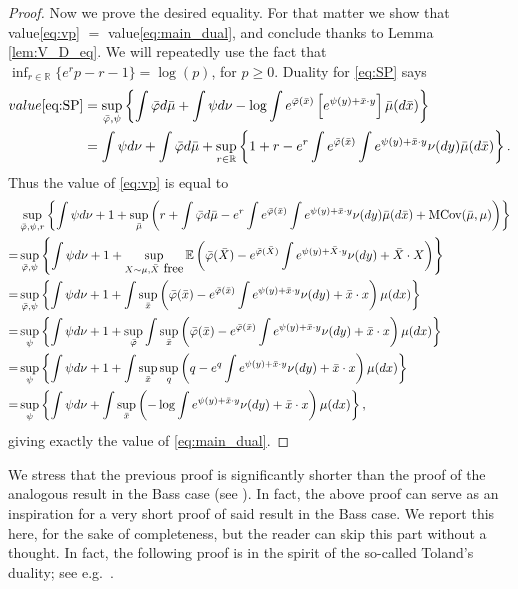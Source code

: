 \documentclass[reqno, a4paper]{amsart}
\theoremstyle{plain}
\theoremstyle{definition}
\theoremstyle{remark}
\numberwithin{equation}{section}
\numberwithin{theorem}{section}
\newcommand{\R}{\mathbb{R}}
\newcommand{\E}{\mathbb{E}}
\newcommand{\MCov}{\textnormal{MCov}}
\begin{document}
\begin{proof}
		Now we prove the desired equality. For that matter we show that value\eqref{eq:vp} $=$ value\eqref{eq:main_dual}, and conclude thanks to Lemma \ref{lem:V_D_eq}. We will repeatedly use the fact that $\inf_{r\in\R}\{ e^{r}p -r-1\}=\log(p)$,
		for $p\geq 0$. Duality for \eqref{eq:SP} says
		\begin{align*}
			value \eqref{eq:SP} & = \sup_{\bar\varphi,\psi}\left \{ \int \bar\varphi d\bar\mu +\int \psi d\nu-\log\int e^{\bar\varphi(\bar x)}\left[  e^{\psi(y)+\bar x\cdot y}\right ]\bar\mu(d\bar x)  \right \} \\
			&= \int \psi d\nu + \int \bar\varphi d\bar\mu + \sup_{r\in\R}\left \{1+r-e^r \int e^{\bar\varphi(\bar x)}\int  e^{\psi(y)+\bar x\cdot y}\nu(dy)\bar\mu(d\bar x)  \right \}.
		\end{align*}
		Thus the value of \eqref{eq:vp} is equal to
		\begin{align*}
			&  \sup_{\bar\varphi,\psi,r}\left\{\int\psi d\nu+1+ \sup_{\bar\mu}\left (r+ \int \bar\varphi d\bar\mu -e^r \int e^{\bar\varphi(\bar x)}\int  e^{\psi(y)+\bar x\cdot y}\nu(dy)\bar\mu(d\bar x) +\MCov(\bar\mu,\mu)\right)  \right\} \\
			=& \sup_{\bar\varphi,\psi}\left\{\int\psi d\nu+1+ \sup_{\substack{X\sim\mu ,\bar X \mbox{ free}}} \E\left (  \bar\varphi(\bar X) -  e^{\bar\varphi(\bar X)}\int  e^{\psi(y)+\bar X\cdot y}\nu(dy) +\bar X\cdot X\right)  \right\}\\
			=& \sup_{\bar\varphi,\psi}\left\{\int\psi d\nu+1+  \int\sup_{\bar x}\left (  \bar\varphi(\bar x) -  e^{\bar\varphi(\bar x)}\int  e^{\psi(y)+\bar x\cdot y}\nu(dy) +\bar x\cdot x\right)  \mu(dx)\right\} \\
			=& \sup_{\psi}\left\{\int\psi d\nu+1+  \sup_{\bar\varphi}\int\sup_{\bar x}\left (  \bar\varphi(\bar x) -  e^{\bar\varphi(\bar x)}\int  e^{\psi(y)+\bar x\cdot y}\nu(dy) +\bar x\cdot x\right)  \mu(dx)\right\} \\
			=& \sup_{\psi}\left\{\int\psi d\nu+1+  \int\sup_{\bar x}\sup_q\left (  q -  e^{q}\int  e^{\psi(y)+\bar x\cdot y}\nu(dy) +\bar x\cdot x\right)  \mu(dx)\right\}\\
			=& \sup_{\psi}\left\{\int\psi d\nu+  \int\sup_{\bar x}\left (  -\log  \int  e^{\psi(y)+\bar x\cdot y}\nu(dy) +\bar x\cdot x\right)  \mu(dx)\right\} ,
		\end{align*}
		giving exactly the value of \eqref{eq:main_dual}.
	\end{proof}
	
	We stress that the previous proof is significantly shorter than the proof of the analogous result in the Bass case (see \cite{BaScTs23}). In fact, the above proof can serve as an inspiration for a very short proof of said result in the Bass case. We report this here, for the sake of completeness, but the reader can skip this part without a thought. In fact, the following proof is in the spirit of the so-called Toland's duality; see e.g.\ \cite{Ca08}.
	
\end{document}
